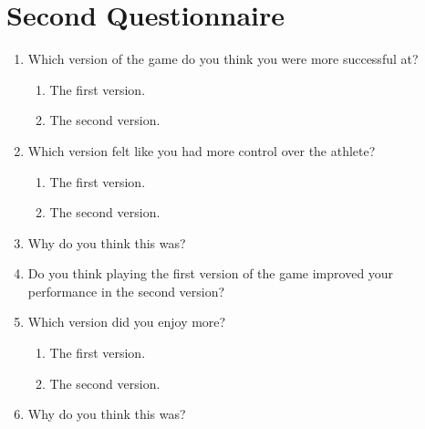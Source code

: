 \documentclass[12pt,a4paper,twoside,openright]{report}
\begin{document}
\section{Second Questionnaire}
\label{qs2}
\begin{enumerate}
    \item Which version of the game do you think you were more successful at?
    \begin{enumerate}
      \item The first version.
      \item The second version.
    \end{enumerate}
    \item Which version felt like you had more control over the athlete?
    \begin{enumerate}
      \item The first version.
      \item The second version.
    \end{enumerate}
    \item Why do you think this was?

    \item Do you think playing the first version of the game improved your performance in the second version?
    \item Which version did you enjoy more?
    \begin{enumerate}
      \item The first version.
      \item The second version.
    \end{enumerate}
    \item Why do you think this was?
\end{enumerate}
\end{document}
